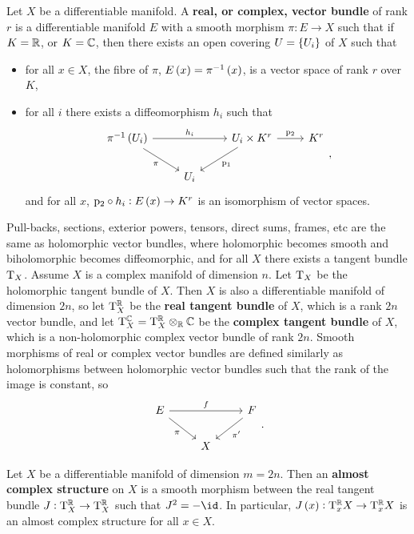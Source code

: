 \begin{definition}
Let $ X $ be a differentiable manifold. A \textbf{real, or complex, vector bundle} of rank $ r $ is a differentiable manifold $ E $ with a smooth morphism $ \pi : E \to X $ such that if $ K = \mathbb{R} $, or $ K = \mathbb{C} $, then there exists an open covering $ U = \cbr{U_i} $ of $ X $ such that
\begin{itemize}
\item for all $ x \in X $, the fibre of $ \pi $, $ E\br{x} = \pi^{-1}\br{x} $, is a vector space of rank $ r $ over $ K $,
\item for all $ i $ there exists a diffeomorphism $ h_i $ such that
$$
\begin{tikzcd}
\pi^{-1}\br{U_i} \arrow{rr}{h_i} \arrow[swap]{dr}{\pi} & & U_i \times K^r \arrow{r}{\p_2} \arrow{dl}{\p_1} & K^r \\
& U_i & &
\end{tikzcd},
$$
and for all $ x $, $ \p_2 \circ h_i : E\br{x} \to K^r $ is an isomorphism of vector spaces.
\end{itemize}
\end{definition}

Pull-backs, sections, exterior powers, tensors, direct sums, frames, etc are the same as holomorphic vector bundles, where holomorphic becomes smooth and biholomorphic becomes diffeomorphic, and for all $ X $ there exists a tangent bundle $ \mathrm{T}_X $. Assume $ X $ is a complex manifold of dimension $ n $. Let $ \mathrm{T}_X $ be the holomorphic tangent bundle of $ X $. Then $ X $ is also a differentiable manifold of dimension $ 2n $, so let $ \mathrm{T}_X^{\mathbb{R}} $ be the \textbf{real tangent bundle} of $ X $, which is a rank $ 2n $ vector bundle, and let $ \mathrm{T}_X^{\mathbb{C}} = \mathrm{T}_X^{\mathbb{R}} \otimes_{\mathbb{R}} \mathbb{C} $ be the \textbf{complex tangent bundle} of $ X $, which is a non-holomorphic complex vector bundle of rank $ 2n $. Smooth morphisms of real or complex vector bundles are defined similarly as holomorphisms between holomorphic vector bundles such that the rank of the image is constant, so
$$
\begin{tikzcd}
E \arrow{rr}{f} \arrow[swap]{dr}{\pi} & & F \arrow{dl}{\pi'} \\
& X &
\end{tikzcd}.
$$

Let $ X $ be a differentiable manifold of dimension $ m = 2n $. Then an \textbf{almost complex structure} on $ X $ is a smooth morphism between the real tangent bundle $ J : \mathrm{T}_X^{\mathbb{R}} \to \mathrm{T}_X^{\mathbb{R}} $ such that $ J^2 = -\id $. In particular, $ J\br{x} : \T_x^\RR X \to \T_x^\RR X $ is an almost complex structure for all $ x \in X $.

